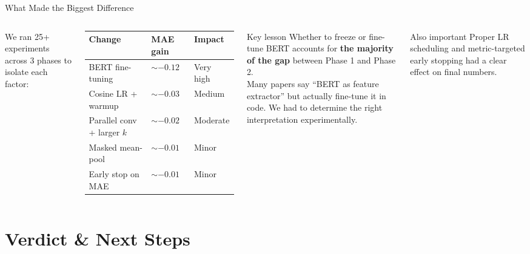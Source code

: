 \documentclass[aspectratio=169]{beamer}
\begin{document}
\begin{frame}{What Made the Biggest Difference}
  \vspace{-4pt}
  \begin{columns}[T]
      \small We ran 25+ experiments across 3 phases to isolate each factor:

      \smallskip
      \renewcommand{\arraystretch}{1.15}
      \small
      \begin{tabular}{lll}
        \toprule
        \textbf{Change} & \textbf{MAE gain} & \textbf{Impact} \\
        \midrule
        BERT fine-tuning  & $\sim -0.12$ & \cellcolor{goodgreen!30}Very high \\
        Cosine LR + warmup & $\sim -0.03$ & \cellcolor{goodgreen!15}Medium \\
        Parallel conv + larger $k$ & $\sim -0.02$ & \cellcolor{goodgreen!10}Moderate \\
        Masked mean-pool  & $\sim -0.01$ & Minor \\
        Early stop on MAE & $\sim -0.01$ & Minor \\
        \bottomrule
      \end{tabular}

      \begin{alertblock}{Key lesson}
        \small
        Whether to freeze or fine-tune BERT accounts for
        \textbf{the majority of the gap} between Phase 1 and Phase 2.\\[4pt]
        Many papers say ``BERT as feature extractor'' but actually
        fine-tune it in code. We had to determine the right interpretation
        experimentally.
      \end{alertblock}

      \vspace{4pt}
      \begin{block}{Also important}
        \small
        Proper LR scheduling and metric-targeted early stopping had a
        clear effect on final numbers.
      \end{block}
  \end{columns}
\end{frame}

\section{Verdict \& Next Steps}
\end{document}
